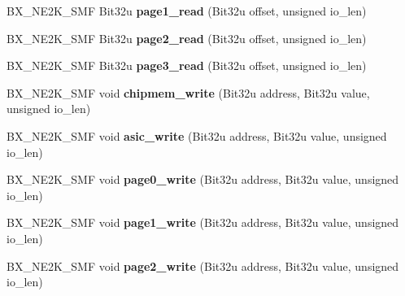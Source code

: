 \begin{DoxyCompactItemize}
\item 
\hypertarget{classbx__ne2k__c_a3bc0414bfaaee20882fc9325345026c2}{B\-X\-\_\-\-N\-E2\-K\-\_\-\-S\-M\-F Bit32u {\bfseries page1\-\_\-read} (Bit32u offset, unsigned io\-\_\-len)}\label{classbx__ne2k__c_a3bc0414bfaaee20882fc9325345026c2}

\item 
\hypertarget{classbx__ne2k__c_a41f6b52287a9b604abb9a113320c09f1}{B\-X\-\_\-\-N\-E2\-K\-\_\-\-S\-M\-F Bit32u {\bfseries page2\-\_\-read} (Bit32u offset, unsigned io\-\_\-len)}\label{classbx__ne2k__c_a41f6b52287a9b604abb9a113320c09f1}

\item 
\hypertarget{classbx__ne2k__c_a5d5d20295c90622630582646f6dd7c85}{B\-X\-\_\-\-N\-E2\-K\-\_\-\-S\-M\-F Bit32u {\bfseries page3\-\_\-read} (Bit32u offset, unsigned io\-\_\-len)}\label{classbx__ne2k__c_a5d5d20295c90622630582646f6dd7c85}

\item 
\hypertarget{classbx__ne2k__c_a2ef4a2eabd25fbe86580a88ed07d907b}{B\-X\-\_\-\-N\-E2\-K\-\_\-\-S\-M\-F void {\bfseries chipmem\-\_\-write} (Bit32u address, Bit32u value, unsigned io\-\_\-len)}\label{classbx__ne2k__c_a2ef4a2eabd25fbe86580a88ed07d907b}

\item 
\hypertarget{classbx__ne2k__c_ae4a9493baea04f813f7af049f0cea4ee}{B\-X\-\_\-\-N\-E2\-K\-\_\-\-S\-M\-F void {\bfseries asic\-\_\-write} (Bit32u address, Bit32u value, unsigned io\-\_\-len)}\label{classbx__ne2k__c_ae4a9493baea04f813f7af049f0cea4ee}

\item 
\hypertarget{classbx__ne2k__c_a2ec128e132867de075b33f521f6966e5}{B\-X\-\_\-\-N\-E2\-K\-\_\-\-S\-M\-F void {\bfseries page0\-\_\-write} (Bit32u address, Bit32u value, unsigned io\-\_\-len)}\label{classbx__ne2k__c_a2ec128e132867de075b33f521f6966e5}

\item 
\hypertarget{classbx__ne2k__c_a071c0490d1c7e4b520c8b99db450986c}{B\-X\-\_\-\-N\-E2\-K\-\_\-\-S\-M\-F void {\bfseries page1\-\_\-write} (Bit32u address, Bit32u value, unsigned io\-\_\-len)}\label{classbx__ne2k__c_a071c0490d1c7e4b520c8b99db450986c}

\item 
\hypertarget{classbx__ne2k__c_a696814dd7e45cd97fc87c9129e478424}{B\-X\-\_\-\-N\-E2\-K\-\_\-\-S\-M\-F void {\bfseries page2\-\_\-write} (Bit32u address, Bit32u value, unsigned io\-\_\-len)}\label{classbx__ne2k__c_a696814dd7e45cd97fc87c9129e478424}


\end{DoxyCompactItemize}

